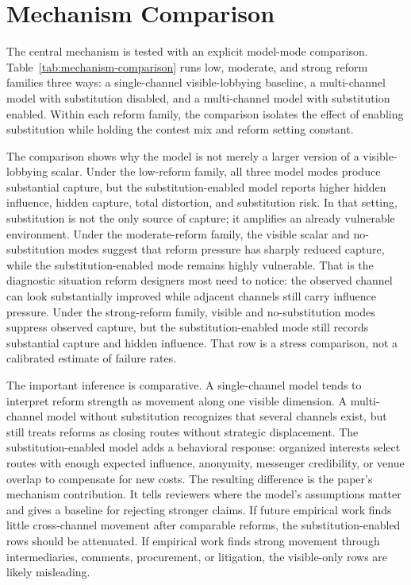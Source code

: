 \section{Mechanism Comparison}

The central mechanism is tested with an explicit model-mode comparison. Table~\ref{tab:mechanism-comparison} runs low, moderate, and strong reform families three ways: a single-channel visible-lobbying baseline, a multi-channel model with substitution disabled, and a multi-channel model with substitution enabled. Within each reform family, the comparison isolates the effect of enabling substitution while holding the contest mix and reform setting constant.



The comparison shows why the model is not merely a larger version of a visible-lobbying scalar. Under the low-reform family, all three model modes produce substantial capture, but the substitution-enabled model reports higher hidden influence, hidden capture, total distortion, and substitution risk. In that setting, substitution is not the only source of capture; it amplifies an already vulnerable environment. Under the moderate-reform family, the visible scalar and no-substitution modes suggest that reform pressure has sharply reduced capture, while the substitution-enabled mode remains highly vulnerable. That is the diagnostic situation reform designers most need to notice: the observed channel can look substantially improved while adjacent channels still carry influence pressure. Under the strong-reform family, visible and no-substitution modes suppress observed capture, but the substitution-enabled mode still records substantial capture and hidden influence. That row is a stress comparison, not a calibrated estimate of failure rates.

The important inference is comparative. A single-channel model tends to interpret reform strength as movement along one visible dimension. A multi-channel model without substitution recognizes that several channels exist, but still treats reforms as closing routes without strategic displacement. The substitution-enabled model adds a behavioral response: organized interests select routes with enough expected influence, anonymity, messenger credibility, or venue overlap to compensate for new costs. The resulting difference is the paper's mechanism contribution. It tells reviewers where the model's assumptions matter and gives a baseline for rejecting stronger claims. If future empirical work finds little cross-channel movement after comparable reforms, the substitution-enabled rows should be attenuated. If empirical work finds strong movement through intermediaries, comments, procurement, or litigation, the visible-only rows are likely misleading.

